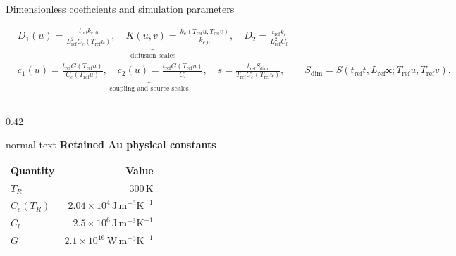 \documentclass[aspectratio=169,10pt]{beamer}
\begin{document}
\begin{frame}[t]{Dimensionless coefficients and simulation parameters}
  \hypertarget{supp:numerics-parameters}{}
  \vspace{-0.18cm}\hfill
  \hspace{0.10cm}\GVBackupIndexButton
  \vspace{-0.05cm}
  \begin{center}
    \scriptsize
    \[
      \begin{aligned}
        &\underbrace{D_1(u)=\frac{t_{\mathrm{ref}}k_{e,0}}{L_{\mathrm{ref}}^2C_e(T_{\mathrm{ref}}u)},\quad
        K(u,v)=\frac{k_e(T_{\mathrm{ref}}u,T_{\mathrm{ref}}v)}{k_{e,0}},\quad
        D_2=\frac{t_{\mathrm{ref}}k_l}{L_{\mathrm{ref}}^2C_l}}_{\text{diffusion scales}}\\[-0.04cm]
        &\underbrace{c_1(u)=\frac{t_{\mathrm{ref}}G(T_{\mathrm{ref}}u)}{C_e(T_{\mathrm{ref}}u)},\quad
        c_2(u)=\frac{t_{\mathrm{ref}}G(T_{\mathrm{ref}}u)}{C_l},\quad
        s=\frac{t_{\mathrm{ref}}S_{\mathrm{dim}}}{T_{\mathrm{ref}}C_e(T_{\mathrm{ref}}u)}}_{\text{coupling and source scales}},\qquad
        S_{\mathrm{dim}}=S(t_{\mathrm{ref}}t,L_{\mathrm{ref}}\mathbf x;T_{\mathrm{ref}}u,T_{\mathrm{ref}}v).
      \end{aligned}
    \]
  \end{center}
  \vspace{-0.20cm}
  \begin{columns}[T,totalwidth=0.94\textwidth]
    \begin{column}{0.42\textwidth}
      \begin{beamercolorbox}[wd=\linewidth,sep=0.46em]{normal text}
        \small\textbf{\color{GVCapacityPurple}Retained Au physical constants}\par
        \vspace{0.07cm}
        \scriptsize
        \renewcommand{\arraystretch}{1.08}
        \begin{tabular}{@{}lr@{}}
          \rowcolor{GVTealTint}
          \textbf{Quantity} & \textbf{Value} \\
          \(T_R\) & \(300\,\mathrm{K}\) \\
          \(C_e(T_R)\) & \(2.04\times10^4\,\mathrm{J\,m^{-3}K^{-1}}\) \\
          \(C_l\) & \(2.5\times10^6\,\mathrm{J\,m^{-3}K^{-1}}\) \\
          \(G\) & \(2.1\times10^{16}\,\mathrm{W\,m^{-3}K^{-1}}\) \\

\end{tabular}
\end{beamercolorbox}
\end{column}
\end{columns}
\end{frame}
\end{document}

